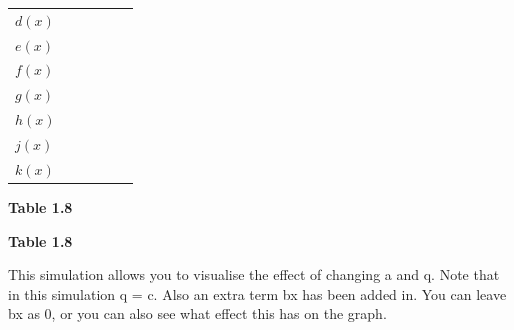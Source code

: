 \begin{table}[H]
\begin{center}
\begin{xtabular}[t]{|l|l|l|l|l|l|}
                  $d\left(x\right)$
                 &
         &
         &
         &
         &
     \tabularnewline{}
                  $e\left(x\right)$
                 &
         &
         &
         &
         &
     \tabularnewline{}
                  $f\left(x\right)$
                 &
         &
         &
         &
         &
     \tabularnewline{}
                  $g\left(x\right)$
                 &
         &
         &
         &
         &
     \tabularnewline{}
                  $h\left(x\right)$
                 &
         &
         &
         &
         &
     \tabularnewline{}
                  $j\left(x\right)$
                 &
         &
         &
         &
         &
     \tabularnewline{}
                  $k\left(x\right)$
                 &
         &
         &
         &
         &
     \tabularnewline{}
    \end{xtabular}
      \end{center}
    \begin{center}{\small\bfseries Table 1.8}\end{center}
    \begin{caption}{\small\bfseries Table 1.8}\end{caption}
\end{table}
    \par
        \label{m39345*eip-679}This simulation allows you to visualise the effect of changing a and q. Note that in this simulation q = c. Also an extra term bx has been added in. You can leave bx as 0, or you can also see what effect this has on the graph.

